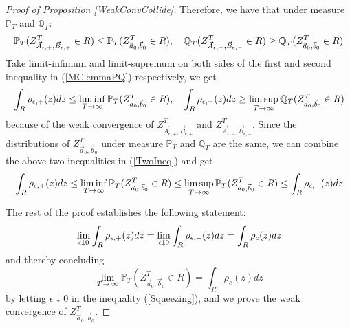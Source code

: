\begin{proof}[Proof of Proposition \ref{WeakConvCollide}]
Therefore, we have that under measure $\mathbb{P}_{T}$ and $\mathbb{Q}_{T}$:
\begin{equation}{\label{MClemmaPQ}}
	\mathbb{P}_{T}(Z^{T}_{\vec{A}_{\epsilon,+},\vec{B}_{\epsilon,+}}\in R)\leq \mathbb{P}_{T}(Z^{T}_{\vec{a}_{0},\vec{b}_{0}}\in R),\quad \mathbb{Q}_{T}(Z^{T}_{\vec{A}_{\epsilon,-},\vec{B}_{\epsilon,-}}\in R)\geq \mathbb{Q}_{T}(Z^{T}_{\vec{a}_{0},\vec{b}_{0}}\in R)
\end{equation}
Take limit-infimum and limit-supremum on both sides of the first and second inequality in (\ref{MClemmaPQ}) respectively, we get
\begin{align}{\label{TwoIneq}}
\int_{R}\rho_{\epsilon,+}(z)dz\leq \liminf_{T\rightarrow\infty}\mathbb{P}_{T}(Z^{T}_{\vec{a}_{0},\vec{b}_{0}}\in R),\quad \int_{R}\rho_{\epsilon,-}(z)dz\geq \limsup_{T\rightarrow\infty}\mathbb{Q}_{T}(Z^{T}_{\vec{a}_{0},\vec{b}_{0}}\in R)
\end{align}
because of the weak convergence of $Z^{T}_{\vec{A}_{\epsilon,+},\vec{B}_{\epsilon,+}}$ and $Z^{T}_{\vec{A}_{\epsilon,-},\vec{B}_{\epsilon,-}}$. Since the distributions of $Z^{T}_{\vec{a}_{0},\vec{b}_{0}}$ under measure $\mathbb{P}_{T}$ and $\mathbb{Q}_{T}$ are the same, we can combine the above two inequalities in (\ref{TwoIneq}) and get
\begin{align}{\label{Squeezing}}
\int_{R}\rho_{\epsilon,+}(z)dz\leq \liminf_{T\rightarrow\infty}\mathbb{P}_{T}(Z^{T}_{\vec{a}_{0},\vec{b}_{0}}\in R)\leq\limsup_{T\rightarrow\infty}\mathbb{P}_{T}(Z^{T}_{\vec{a}_{0},\vec{b}_{0}}\in R)\leq\int_{R}\rho_{\epsilon,-}(z)dz	
\end{align}

The rest of the proof establishes the following statement:
\begin{align}{\label{WeakConvConclude}}
\lim_{\epsilon\downarrow 0}\int_{R}\rho_{\epsilon,+}(z)dz=\lim_{\epsilon\downarrow 0}\int_{R}\rho_{\epsilon,-}(z)dz=\int_{R}\rho_{c}(z)dz
\end{align}
and thereby concluding $$\lim_{T\rightarrow\infty}\mathbb{P}_{T}(Z^{T}_{\vec{a}_{0},\vec{b}_{0}}\in R)=\int_{R}\rho_{c}(z)dz$$ by letting $\epsilon\downarrow 0$ in the inequality (\ref{Squeezing}), and we prove the weak convergence of $Z^{T}_{\vec{a}_{0},\vec{b}_{0}}$.


\end{proof}
